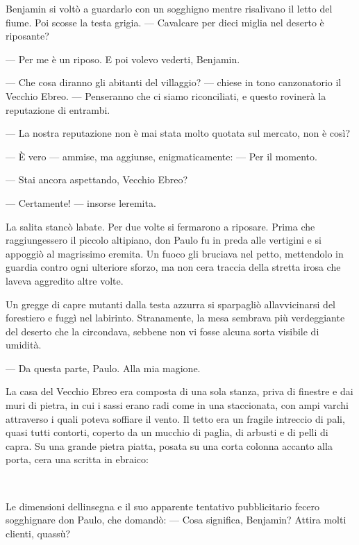 Benjamin si voltò a guardarlo con un sogghigno mentre risalivano il
letto del fiume. Poi scosse la testa grigia. --- Cavalcare per dieci
miglia nel deserto è riposante?

--- Per me è un riposo. E poi volevo vederti, Benjamin.

--- Che cosa diranno gli abitanti del villaggio? --- chiese in tono
canzonatorio il Vecchio Ebreo. --- Penseranno che ci siamo riconciliati,
e questo rovinerà la reputazione di entrambi.

--- La nostra reputazione non è mai stata molto quotata sul mercato, non
è così?

--- È vero --- ammise, ma aggiunse, enigmaticamente: --- Per il momento.

--- Stai ancora aspettando, Vecchio Ebreo?

--- Certamente! --- insorse l\textquotesingle eremita.

La salita stancò l\textquotesingle abate. Per due volte si fermarono a
riposare. Prima che raggiungessero il piccolo altipiano, don Paulo fu in
preda alle vertigini e si appoggiò al magrissimo eremita. Un fuoco gli
bruciava nel petto, mettendolo in guardia contro ogni ulteriore sforzo,
ma non c\textquotesingle era traccia della stretta irosa che
l\textquotesingle aveva aggredito altre volte.

Un gregge di capre mutanti dalla testa azzurra si sparpagliò
all\textquotesingle avvicinarsi del forestiero e fuggì nel labirinto.
Stranamente, la mesa sembrava più verdeggiante del deserto che la
circondava, sebbene non vi fosse alcuna sorta visibile di umidità.

--- Da questa parte, Paulo. Alla mia magione.

La casa del Vecchio Ebreo era composta di una sola stanza, priva di
finestre e dai muri di pietra, in cui i sassi erano radi come in una
staccionata, con ampi varchi attraverso i quali poteva soffiare il
vento. Il tetto era un fragile intreccio di pali, quasi tutti contorti,
coperto da un mucchio di paglia, di arbusti e di pelli di capra. Su una
grande pietra piatta, posata su una corta colonna accanto alla porta,
c\textquotesingle era una scritta in ebraico:

\begin{center}
	{\Huge{}}
\end{center}
~

Le dimensioni dell\textquotesingle insegna e il suo apparente tentativo
pubblicitario fecero sogghignare don Paulo, che domandò: --- Cosa
significa, Benjamin? Attira molti clienti, quassù?

